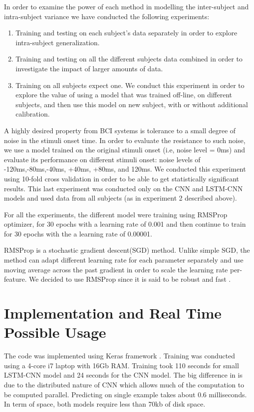 \documentclass[
12pt, %
english, %
doublespacing, %
headsepline, %
]{MastersDoctoralThesis} %
\begin{document}
							
								
In order to examine the power of each method in modelling the inter-subject and  intra-subject variance we have conducted the following experiments:
\begin{enumerate}
	\item Training and testing on each subject's data separately in order to explore intra-subject generalization.
	\item Training and testing on all the different subjects data combined in order to investigate the impact of larger amounts of data.
	\item Training on all subjects expect one. We conduct this experiment in order to explore the value of using a model that was trained off-line, on different subjects, and then use this model on new subject, with or without additional calibration.
\end{enumerate}
									
A highly desired property from BCI systems is tolerance to a small degree of noise in the stimuli onset time.  In order to evaluate the resistance to such noise, we use a model trained on the original stimuli onset (i.e, noise level = 0ms) and evaluate its performance on different stimuli onset: noise levels of -120ms,-80ms,-40ms, +40ms, +80ms, and 120ms. We conducted this experiment using 10-fold cross validation in order to be able to get statistically significant results. This last experiment was conducted only on the CNN and LSTM-CNN models and used data from all subjects (as in experiment 2 described above).

For all the experiments, the different model were training using RMSProp~\cite{tieleman2012lecture} optimizer, for 30 epochs with a learning rate of 0.001 and then continue to train for 30 epochs with the a learning rate of 0.00001.


RMSProp \cite{tieleman2012lecture} is a stochastic gradient descent(SGD) method. Unlike simple SGD, the method can adapt different learning rate for each parameter separately and use moving average across the past gradient in order to scale the learning rate per-feature. We decided to use RMSProp since it is said to be robust and fast \cite{xu2015show, karpathy2015deep, szegedy2016rethinking}.


\section{Implementation and Real Time Possible Usage}
The code was implemented using Keras framework \cite{chollet2015keras}. Training was conducted using a 4-core i7 laptop with 16Gb RAM. Training took 110 seconds for small LSTM-CNN model and 24 seconds for the CNN model. The big difference in is due to the distributed nature of  CNN which allows much of the computation to be computed parallel. Predicting on single example takes about 0.6 milliseconds. In term of space, both models require less than 70kb of disk space.
\end{document}
